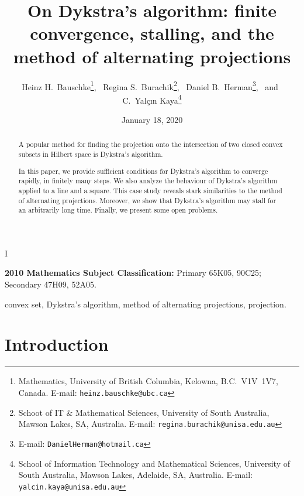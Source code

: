 I\documentclass[12pt]{article}
\begin{document}



\title{ \textsc
On Dykstra's algorithm: finite convergence, stalling, 
and the method of alternating projections
}

\author{
Heinz H.\ Bauschke\thanks{
Mathematics, University
of British Columbia,
Kelowna, B.C.\ V1V~1V7, Canada. E-mail:
\texttt{heinz.bauschke@ubc.ca}},~
Regina S.\ Burachik\thanks{
Schoot of IT \& Mathematical Sciences, 
University of South Australia, 
Mawson Lakes, SA, Australia. 
 E-mail: \texttt{regina.burachik@unisa.edu.au}
},~
Daniel B.\ Herman\thanks{E-mail: \texttt{DanielHerman@hotmail.ca}},
~and~
C.\ Yal\c{c}{\i}n Kaya\thanks{
School of Information Technology and Mathematical Sciences, 
University of South Australia, 
Mawson Lakes, Adelaide, SA, Australia.
 E-mail: \texttt{yalcin.kaya@unisa.edu.au}}
}

\date{January 18, 2020}


\maketitle



\begin{abstract}
A popular method for finding the projection onto the intersection 
of two closed convex subsets in Hilbert space is Dykstra's algorithm. 

In this paper, we provide sufficient conditions for Dykstra's algorithm 
to converge rapidly, in finitely many steps. 
We also analyze the behaviour of Dykstra's algorithm 
applied to a line and a square. 
This case study reveals stark similarities to the method of alternating 
projections. Moreover, we show that Dykstra's algorithm 
may stall for an arbitrarily long time. 
Finally, we present some open problems. 
\end{abstract}
{ 
\noindent
{\bfseries 2010 Mathematics Subject Classification:}
{Primary 
65K05, 
90C25;
Secondary 
47H09,
52A05.
}

 
convex set, 
Dykstra's algorithm,
method of alternating projections,
projection.
}

\section{Introduction}
\end{document}
